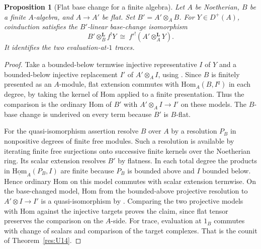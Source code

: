 \documentclass[11pt,oneside,openany]{book}
\newtheorem{proposition}[theorem]{Proposition}
\theoremstyle{definition}
\theoremstyle{remark}
\begin{document}
\begin{proposition}[Flat base change for a finite algebra]\label{res:U16}
Let \(A\) be Noetherian, \(B\) be a finite \(A\)-algebra,
and \(A\to A'\) be flat. Set \(B'=A'\otimes_A B\).
For \(Y\in D^+(A)\), coinduction satisfies the \(B'\)-linear
base-change isomorphism
\[
 B'\otimes_B^{\mathbf L}f^!Y
   \ \cong\ f'^!(A'\otimes_A^{\mathbf L}Y).
\]
It identifies the two evaluation-at-\(1\) traces.
\end{proposition}
\begin{proof}
Take a bounded-below termwise injective representative \(I\) of
\(Y\) and a bounded-below injective replacement \(I'\) of
\(A'\otimes_A I\), using \cite[R01, R03]{ha-core}.
Since \(B\) is finitely presented as an \(A\)-module, flat
extension commutes with \(\mathrm{Hom}_A(B,I^q)\) in each
degree, by taking the kernel of Hom applied to a finite
presentation. Thus the comparison is the ordinary Hom
of \(B'\) with \(A'\otimes_A I\to I'\) on these models.
The \(B\)-base change is underived on every term because
\(B'\) is \(B\)-flat.

For the quasi-isomorphism assertion resolve \(B\) over \(A\)
by a resolution \(P_B\) in nonpositive degrees of finite free
modules. Such a resolution is available by iterating finite
free surjections onto successive finite kernels over the
Noetherian ring. Its scalar extension resolves \(B'\)
by flatness. In each total degree the products in
\(\underline{\mathrm{Hom}}_A(P_B,I)\) are finite because
\(P_B\) is bounded above and \(I\) bounded below. Hence
ordinary Hom on this model commutes with scalar extension
termwise. On the base-changed model, Hom from the
bounded-above projective resolution to \(A'\otimes I\to I'\)
is a quasi-isomorphism by \cite[R03]{ha-core}.
Comparing the two projective models with Hom against
the injective targets proves the claim, since flat tensor
preserves the comparison on the \(A\)-side.
For trace, evaluation at \(1_B\) commutes with change of
scalars and comparison of the target complexes. That is the
counit of Theorem~\ref{res:U14}.
\end{proof}
\end{document}

